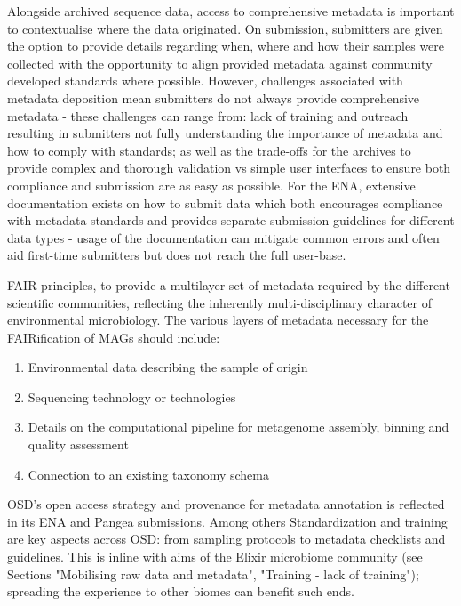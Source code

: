       Alongside archived sequence data, access to comprehensive metadata is important to contextualise where the data originated. 
      On submission, submitters are given the option to provide details regarding when, where and how their samples were collected with the opportunity to align provided metadata against community developed standards where possible. 
      However, challenges associated with metadata deposition mean submitters do not always provide comprehensive metadata - these challenges can range from: 
      lack of training and outreach resulting in submitters not fully understanding the importance of metadata and how to comply with standards; 
      as well as the trade-offs for the archives to provide complex and thorough validation vs simple user interfaces to ensure both compliance and submission are as easy as possible. 
      For the ENA, extensive documentation exists on how to submit data which both encourages compliance with metadata standards and provides separate submission guidelines for different data types - usage of the documentation can mitigate common errors and often aid first-time submitters but does not reach the full user-base. 

      FAIR principles, to provide a multilayer set of metadata required by the different scientific communities, reflecting the inherently multi-disciplinary character of environmental microbiology. 
      The various layers of metadata necessary for the FAIRification of MAGs should include:
      \begin{enumerate}
         \item Environmental data describing the sample of origin
         \item Sequencing technology or technologies
         \item Details on the computational pipeline for metagenome assembly, binning and quality assessment
         \item Connection to an existing taxonomy schema
      \end{enumerate}


      OSD’s open access strategy and provenance for metadata annotation is reflected in its ENA and Pangea submissions. 
      Among others Standardization and training are key aspects across OSD: from sampling protocols to metadata checklists and guidelines. 
      This is inline with aims of the Elixir microbiome community (see Sections "Mobilising raw data and metadata", 
      "Training - lack of training"); 
      spreading the experience to other biomes can benefit such ends.


